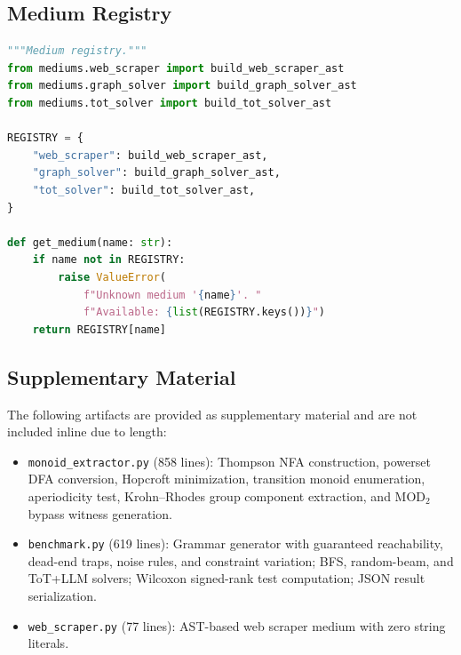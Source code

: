 \documentclass[letterpaper,11pt]{article}
\begin{document}
\subsection{Medium Registry}\label{app:registry}

\begin{lstlisting}[language=Python,caption={mediums/\_\_init\_\_.py (13 lines)}]
"""Medium registry."""
from mediums.web_scraper import build_web_scraper_ast
from mediums.graph_solver import build_graph_solver_ast
from mediums.tot_solver import build_tot_solver_ast

REGISTRY = {
    "web_scraper": build_web_scraper_ast,
    "graph_solver": build_graph_solver_ast,
    "tot_solver": build_tot_solver_ast,
}

def get_medium(name: str):
    if name not in REGISTRY:
        raise ValueError(
            f"Unknown medium '{name}'. "
            f"Available: {list(REGISTRY.keys())}")
    return REGISTRY[name]
\end{lstlisting}

\subsection{Supplementary Material}\label{app:supplementary}

The following artifacts are provided as supplementary material and are not
included inline due to length:
\begin{itemize}
  \item \texttt{monoid\_extractor.py} (858 lines): Thompson NFA construction,
    powerset DFA conversion, Hopcroft minimization, transition monoid
    enumeration, aperiodicity test, Krohn--Rhodes group component extraction,
    and $\mathrm{MOD}_2$ bypass witness generation.
  \item \texttt{benchmark.py} (619 lines): Grammar generator with guaranteed
    reachability, dead-end traps, noise rules, and constraint variation;
    BFS, random-beam, and ToT+LLM solvers; Wilcoxon signed-rank test
    computation; JSON result serialization.
  \item \texttt{web\_scraper.py} (77 lines): AST-based web scraper medium
    with zero string literals.
\end{itemize}

\end{document}
